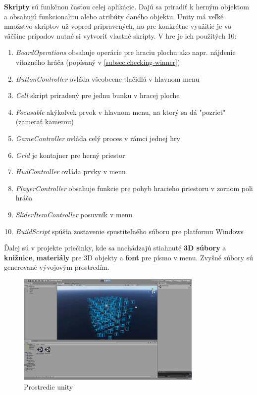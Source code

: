 \textbf{Skripty} sú funkčnou časťou celej aplikácie.
Dajú sa priradiť k herným objektom a obsahujú funkcionalitu alebo atribúty daného objektu.
Unity má veľké množstvo skriptov už vopred pripravených, no pre konkrétne využitie je vo väčšine prípadov nutné si
vytvoriť vlastné skripty.
V hre je ich použitých 10:
\begin{enumerate}
    \item \emph{BoardOperations} obsahuje operácie pre hraciu plochu ako napr. nájdenie víťazného hráča (popísaný
    v \autoref{subsec:checking-winner})
    \item \emph{ButtonController} ovláda všeobecne tlačidlá v hlavnom menu
    \item \emph{Cell} skript priradený pre jednu bunku v hracej ploche
    \item \emph{Focusable} akýkoľvek prvok v hlavnom menu, na ktorý sa dá "pozrieť" (zamerať kamerou)
    \item \emph{GameController} ovláda celý proces v rámci jednej hry
    \item \emph{Grid} je kontajner pre herný priestor
    \item \emph{HudController} ovláda prvky v menu
    \item \emph{PlayerController} obsahuje funkcie pre pohyb hracieho priestoru v zornom poli hráča
    \item \emph{SliderItemController} posuvník v menu
    \item \emph{BuildScript} spúšťa zostavenie spustiteľného súboru pre platformu Windows
\end{enumerate}

Ďalej sú v projekte priečinky, kde sa nachádzajú stiahnuté \textbf{3D súbory} a \textbf{knižnice}, \textbf{materiály}
pre 3D objekty a \textbf{font} pre písmo v menu.
Zvyšné súbory sú generované vývojovým prostredím.

\begin{figure}[H]
    \centering
    \includegraphics[width=0.8\textwidth]{images/unity.jpg}
    \caption{Prostredie unity}
\end{figure}\label{figure:unity}

